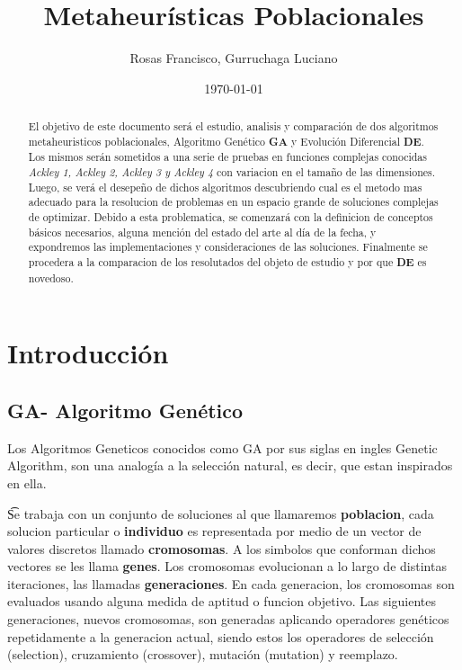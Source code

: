 \documentclass[10pt]{article}
\title{Metaheurísticas Poblacionales} %
\author{Rosas Francisco, Gurruchaga Luciano}
\date{\today} %
\begin{document}
\maketitle

\begin{abstract}

El objetivo de este documento será el estudio, analisis y comparación de dos algoritmos metaheuristicos poblacionales, Algoritmo Genético \textbf{GA} y Evolución Diferencial  \textbf{DE}. Los mismos serán sometidos a una serie de pruebas en funciones complejas conocidas  \textit{Ackley 1, Ackley 2, Ackley 3 y Ackley 4 }con variacion en el tamaño de las dimensiones. Luego, se verá el desepeño de dichos algoritmos descubriendo cual es el metodo mas adecuado para la resolucion de problemas en un espacio grande de soluciones complejas de optimizar. 
Debido a esta problematica, se comenzará con la definicion de conceptos básicos necesarios, alguna mención del estado del arte al día de la fecha, y expondremos las  implementaciones y consideraciones de las soluciones. Finalmente se procedera a la comparacion de los resolutados del objeto de estudio y por que  \textbf{DE} es novedoso.

\end{abstract}


\section{Introducción}
\subsection{\textbf{GA}- Algoritmo Genético }

Los Algoritmos Geneticos conocidos como GA por sus siglas en ingles Genetic Algorithm, son una analogía a la selección natural, es decir, que estan inspirados en ella.

\t Se trabaja con un conjunto de soluciones al que llamaremos \textbf{poblacion}, cada solucion particular o \textbf{individuo} es representada por medio de un vector de valores discretos llamado \textbf{cromosomas}. A los simbolos que conforman dichos vectores se les llama \textbf{genes}. Los cromosomas evolucionan a lo largo de distintas iteraciones, las llamadas \textbf{generaciones}. En cada generacion, los cromosomas son evaluados usando alguna medida de aptitud o funcion objetivo. Las siguientes generaciones, nuevos cromosomas, son generadas aplicando operadores genéticos repetidamente a la generacion actual, siendo estos los operadores de selección (selection), cruzamiento (crossover), mutación (mutation) y reemplazo.
\end{document}
